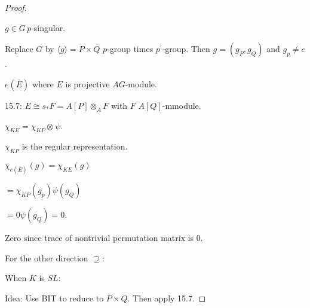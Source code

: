 \documentclass{article}
\theoremstyle{definition}
\begin{document}
\begin{proof}
    \begin{center}
    \end{center}

    \(g\in G\,p\)-singular.
    
    Replace \(G\) by \(\langle g \rangle = P \times Q\) \(p\)-group times \(p^{\prime}\)-group. Then \(g = (g_P, g_Q)\) and \(g_p \neq e\).

    \(e(\overline{E})\) where \(E\) is projective \(AG\)-module.
    
    15.7: \(E \cong s_{\ast} F = A[P] \otimes_A F\) with \(F\) \(A[Q]\)-mmodule.

    \(\chi_{KE} = \chi_{KP} \otimes_{} \psi\).

    \(\chi_{KP}\) is the regular representation.

    \(\chi_{e(\overline{E})}(g) = \chi_{KE}(g)\) 

    \(= \chi_{KP}(g_p)\psi(g_Q)\)

    \(= 0 \psi (g_Q) = 0\).

    Zero since trace of nontrivial permutation matrix is \(0\).

    For the other direction \(\supseteq:\) 

    When \(K\) is \(SL\):

    Idea: Use BIT to reduce to \(P \times Q\). Then apply 15.7.

\end{proof}
\end{document}
